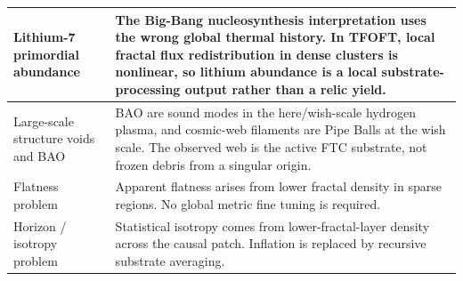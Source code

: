 \documentclass[11pt,a4paper]{article}
\begin{document}
\begin{center}
\begin{longtable}{|L{4.25cm}|L{9.85cm}|}
\hline
Lithium-7 primordial abundance & The Big-Bang nucleosynthesis interpretation uses the wrong global thermal history. In TFOFT, local fractal flux redistribution in dense clusters is nonlinear, so lithium abundance is a local substrate-processing output rather than a relic yield. \\
\hline
Large-scale structure voids and BAO & BAO are sound modes in the here/wish-scale hydrogen plasma, and cosmic-web filaments are Pipe Balls at the wish scale. The observed web is the active FTC substrate, not frozen debris from a singular origin. \\
\hline
Flatness problem & Apparent flatness arises from lower fractal density in sparse regions. No global metric fine tuning is required. \\
\hline
Horizon / isotropy problem & Statistical isotropy comes from lower-fractal-layer density across the causal patch. Inflation is replaced by recursive substrate averaging. \\
\hline


\end{longtable}
\end{center}
\end{document}
